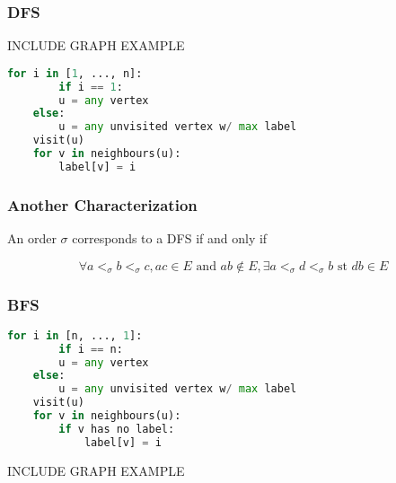 \documentclass{beamer}
\begin{document}
\begin{frame}[fragile]\frametitle{DFS}
    INCLUDE GRAPH EXAMPLE
    \begin{lstlisting}[language = Python]
    for i in [1, ..., n]:
        if i == 1:
	    u = any vertex
	else:
	    u = any unvisited vertex w/ max label
	visit(u)
	for v in neighbours(u):
	    label[v] = i
    \end{lstlisting}
\end{frame}

\begin{frame}\frametitle{Another Characterization}
    \begin{theorem}
        An order $\sigma$ corresponds to a DFS if and only if
	    
	    $$\forall a <_{\sigma} b <_{\sigma} c, ac \in E\text{ and }ab \notin E, \exists a <_{\sigma} d <_{\sigma} b\text{ st }db \in E$$
    \end{theorem}
    \begin{center}
    \end{center}

\end{frame}


\begin{frame}[fragile]\frametitle{BFS}
    \begin{lstlisting}[language = Python]
    for i in [n, ..., 1]:
        if i == n:
	    u = any vertex
	else:
	    u = any unvisited vertex w/ max label
	visit(u)
	for v in neighbours(u):
	    if v has no label:
	        label[v] = i
    \end{lstlisting}

    INCLUDE GRAPH EXAMPLE
\end{frame}
\end{document}
